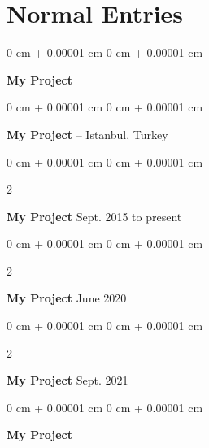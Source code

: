 \documentclass[10pt, letterpaper]{article}
\newenvironment{onecolentry}{
    \begin{adjustwidth}{
        0 cm + 0.00001 cm
    }{
        0 cm + 0.00001 cm
    }
}{
    \end{adjustwidth}
} %
\newenvironment{twocolentry}[2][]{
    \onecolentry
    \def\secondColumn{#2}
    \setcolumnwidth{\fill, 4.5 cm}
    \begin{paracol}{2}
}{
    \switchcolumn \raggedleft \secondColumn
    \end{paracol}
    \endonecolentry
} %
\begin{document}
    
    \section{Normal Entries}

        
        \begin{onecolentry}
            \textbf{My Project}\end{onecolentry}



        \vspace{0.2 cm}

        \begin{onecolentry}
            \textbf{My Project} -- Istanbul, Turkey\end{onecolentry}



        \vspace{0.2 cm}

        \begin{twocolentry}{
            Sept. 2015 to present
        }
            \textbf{My Project}\end{twocolentry}



        \vspace{0.2 cm}

        \begin{twocolentry}{
            June 2020
        }
            \textbf{My Project}\end{twocolentry}



        \vspace{0.2 cm}

        \begin{twocolentry}{
            Sept. 2021
        }
            \textbf{My Project}\end{twocolentry}



        \vspace{0.2 cm}

        \begin{onecolentry}
            \textbf{My Project}\end{onecolentry}
\end{document}
